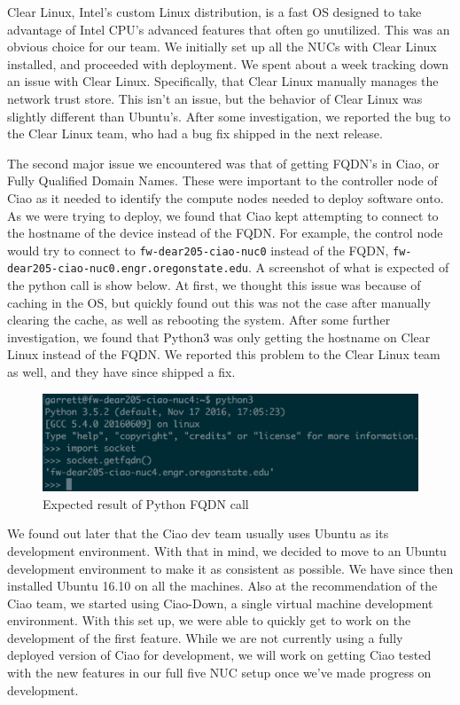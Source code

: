 \documentclass[10pt,onecolumn,journal,draftclsnofoot]{IEEEtran}
\begin{document}
Clear Linux, Intel's custom Linux distribution, is a fast OS designed to take
advantage of Intel CPU's advanced features that often go unutilized. This was an
obvious choice for our team. We initially set up all the NUCs with Clear Linux
installed, and proceeded with deployment. We spent about a week tracking down an
issue with Clear Linux. Specifically, that Clear Linux manually manages the
network trust store. This isn't an issue, but the behavior of Clear Linux was
slightly different than Ubuntu's. After some investigation, we reported the bug
to the Clear Linux team, who had a bug fix shipped in the next release.

The second major issue we encountered was that of getting FQDN's in Ciao, or
Fully Qualified Domain Names. These were important to the controller node of
Ciao as it needed to identify the compute nodes needed to deploy software onto.
As we were trying to deploy, we found that Ciao kept attempting to connect to
the hostname of the device instead of the FQDN. For example, the control node
would try to connect to \texttt{fw-dear205-ciao-nuc0} instead of the FQDN,
\texttt{fw-dear205-ciao-nuc0.engr.oregonstate.edu}. A screenshot of what is
expected of the python call is show below. At first, we thought this issue was
because of caching in the OS, but quickly found out this was not the case after
manually clearing the cache, as well as rebooting the system.  After some
further investigation, we found that Python3 was only getting the hostname on
Clear Linux instead of the FQDN. We reported this problem to the Clear Linux
team as well, and they have since shipped a fix.

\begin{figure}[h]
	\caption{Expected result of Python FQDN call}
	\centering
	\includegraphics[scale=0.5]{getfqdn.eps}
\end{figure}

We found out later that the Ciao dev team usually uses Ubuntu as its development
environment. With that in mind, we decided to move to an Ubuntu development
environment to make it as consistent as possible. We have since then installed
Ubuntu 16.10 on all the machines. Also at the recommendation of the Ciao team,
we started using Ciao-Down, a single virtual machine development environment.
With this set up, we were able to quickly get to work on the development of the
first feature. While we are not currently using a fully deployed version of Ciao
for development, we will work on getting Ciao tested with the new features in
our full five NUC setup once we've made progress on development.
\end{document}
